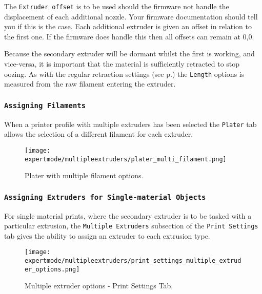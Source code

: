 
The \texttt{Extruder offset} is to be used should the firmware not handle the displacement of each additional nozzle.  Your firmware documentation should tell you if this is the case.  Each additional extruder is given an offset in relation to the first one.  If the firmware does handle this then all offsets can remain at 0,0.

Because the secondary extruder will be dormant whilst the first is working, and vice-versa, it is important that the material is sufficiently retracted to stop oozing.  As with the regular retraction settings (see p.\pageref{fig:retraction_settings}) the \texttt{Length} options is measured from the raw filament entering the extruder.


\subsubsection{\texttt{Assigning Filaments}} %
\label{sub:assigning_filaments}
When a printer profile with multiple extruders has been selected the \texttt{Plater} tab allows the selection of a different filament for each extruder.

\begin{figure}[H]
\centering
\texttt{[image: expertmode/multipleextruders/plater\_multi\_filament.png]}
\caption{Plater with multiple filament options.}
\label{fig:plater_multi_filament}
\end{figure}


\subsubsection{\texttt{Assigning Extruders for Single-material Objects}} %
\label{sub:assigning_extruders}

For single material prints, where the secondary extruder is to be tasked with a particular extrusion, the \texttt{Multiple Extruders} subsection of the \texttt{Print Settings} tab gives the ability to assign an extruder to each extrusion type.

\begin{figure}[H]
\centering
\texttt{[image: expertmode/multipleextruders/print\_settings\_multiple\_extruder\_options.png]}
\caption{Multiple extruder options - Print Settings Tab.}
\label{fig:advanced_multiple_extruder_options}
\end{figure}

